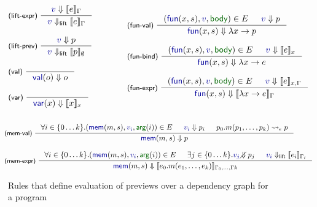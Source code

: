 \documentclass[english,crc]{programming}
\theoremstyle{plain}
\theoremstyle{definition}
\newcommand{\ident}[1]{\textnormal{\textcolor{idclr}{\sffamily #1}}}
\newcommand{\bndclr}[1]{\textcolor{kvdclr}{#1}}
\newcommand{\bnd}[1]{\textnormal{\textcolor{kvdclr}{\sffamily #1}}}
\newcommand{\blbl}[1]{\textnormal{\textcolor{numclr}{\sffamily #1}}}
\newcommand{\rname}[1]{{\sffamily(#1)}}
\begin{document}
\begin{figure}
\begin{equation*}
\vspace{-1.5em}
\hspace{-0.5em}
\begin{array}{l}
\inference[\rname{lift-expr}~]
  {\bndclr{v} \Downarrow \llbracket e \rrbracket_\Gamma}
  {\bndclr{v} \Downarrow_{\ident{lift}} \llbracket e \rrbracket_\Gamma}
\\
\\
\inference[\rname{lift-prev}~]
  {\bndclr{v} \Downarrow p}
  {\bndclr{v} \Downarrow_{\ident{lift}} \llbracket p \rrbracket_\emptyset}
\\
\\
\inference[\rname{val}~]
  {~}
  {\bnd{val}(o) \Downarrow o }
\\
\\
\inference[\rname{var}~]
  {~}
  {\bnd{var}(x) \Downarrow \llbracket x \rrbracket_x}
  \\[0.5em]~
\end{array}
\qquad\quad
\begin{array}{l}
\inference[\rname{fun-val}~]
  { (\bnd{fun}(x, s), \bndclr{v}, \blbl{body}) \in E & \bndclr{v} \Downarrow p }
  { \bnd{fun}(x, s) \Downarrow \lambda x\rightarrow p }
\\
\\
\inference[\rname{fun-bind}~]
  { (\bnd{fun}(x, s), \bndclr{v}, \blbl{body}) \in E & \bndclr{v} \Downarrow \llbracket e \rrbracket_{x} }
  { \bnd{fun}(x, s) \Downarrow \lambda x\rightarrow e }
\\
\\
\inference[\rname{fun-expr}~]
  { (\bnd{fun}(x, s), \bndclr{v}, \blbl{body}) \in E & \bndclr{v} \Downarrow \llbracket e \rrbracket_{x,\Gamma} }
  { \bnd{fun}(x, s) \Downarrow \llbracket \lambda x\rightarrow e \rrbracket_\Gamma }
\\[0.5em]~
\end{array}
\end{equation*}
\vspace{-0.5em}
\begin{equation*}
\hspace{-1em}
\begin{array}{l}
\inference[\rname{mem-val}~]
  { \forall i\in\{0\ldots k\}.(\bnd{mem}(m, s), \bndclr{v_i}, \blbl{arg}(i)) \in E & \bndclr{v_i} \Downarrow p_i
    & p_0.m(p_1, \ldots, p_k) \rightsquigarrow_\epsilon p }
  { \bnd{mem}(m, s) \Downarrow p }
\\
\\
\inference[\rname{mem-expr}~]
  { \forall i\in\{0\ldots k\}.(\bnd{mem}(m, s), \bndclr{v_i}, \blbl{arg}(i)) \in E & \exists j\in\{0\ldots k\}.\bndclr{v_j}\diagup\hspace{-1em}\Downarrow p_j
   & \bndclr{v_i} \Downarrow_{\ident{lift}} \llbracket e_i \rrbracket_{\Gamma_i}  }
  { \bnd{mem}(m, s) \Downarrow \llbracket e_0.m(e_1, \ldots, e_k) \rrbracket_{\Gamma_0,\ldots,\Gamma k} }
\\
\end{array}
\end{equation*}
\caption{Rules that define evaluation of previews over a dependency graph for a program}
\label{fig:eval}
\end{figure}
\end{document}
